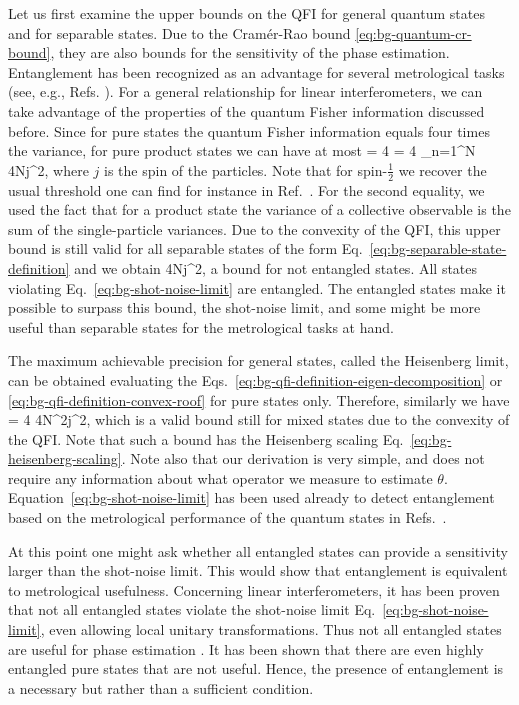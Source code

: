 Let us first examine the upper bounds on the QFI for general quantum states and for separable states.
Due to the Cram\'er-Rao bound \eqref{eq:bg-quantum-cr-bound}, they are also bounds for the sensitivity of the phase estimation.
Entanglement has been recognized as an advantage for several metrological tasks (see, e.g., Refs. \cite{Sorensen2001, Boixo2008}).
For a general relationship for linear interferometers, we can take advantage of the properties of the quantum Fisher information discussed before.
Since for pure states the quantum Fisher information equals four times the variance, for pure product states we can have at most
\be
   = 4 = 4 \sum_{n=1}^N  \leqslant 4Nj^2,
\ee
where $j$ is the spin of the particles.
Note that for spin-$\frac{1}{2}$ we recover the usual threshold one can find for instance in Ref.~\cite{Giovannetti2006}.
For the second equality, we used the fact that for a product state the variance of a collective observable is the sum of the single-particle variances.
Due to the convexity of the QFI, this upper bound is still valid for all separable states of the form Eq.~\eqref{eq:bg-separable-state-definition} and we obtain \cite{Pezze2009}
\be
  \label{eq:bg-shot-noise-limit}
   \leqslant 4Nj^2,
\ee
a bound for not entangled states.
All states violating Eq.~\eqref{eq:bg-shot-noise-limit} are entangled.
The entangled states make it possible to surpass this bound, the shot-noise limit, and some might be more useful than separable states for the metrological tasks at hand.

The maximum achievable precision for general states, called the Heisenberg limit, can be obtained evaluating the Eqs.~\eqref{eq:bg-qfi-definition-eigen-decomposition} or \eqref{eq:bg-qfi-definition-convex-roof} for pure states only.
Therefore, similarly we have
\be
  \label{eq:bg-heisenberg-limit}
   = 4 \leqslant 4N^2j^2,
\ee
which is a valid bound still for mixed states due to the convexity of the QFI.
Note that such a bound has the Heisenberg scaling Eq.~\eqref{eq:bg-heisenberg-scaling}.
Note also that our derivation is very simple, and does not require any information about what operator we measure to estimate $\theta$.
Equation~\eqref{eq:bg-shot-noise-limit} has been used already to detect entanglement based on the metrological performance of the quantum states in Refs.~\cite{Krischek2011, Luecke2011}.

At this point one might ask whether all entangled states can provide a sensitivity larger than the shot-noise limit.
This would show that entanglement is equivalent to metrological usefulness.
Concerning linear interferometers, it has been proven that not all entangled states violate the shot-noise limit Eq.~\eqref{eq:bg-shot-noise-limit}, even allowing local unitary transformations.
Thus not all entangled states are useful for phase estimation \cite{Hyllus2010}.
It has been shown that there are even highly entangled pure states that are not useful.
Hence, the presence of entanglement is a necessary but rather than a sufficient condition.

